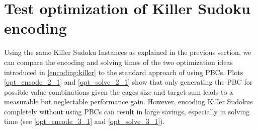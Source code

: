 \section{Test optimization of Killer Sudoku encoding}
Using the same Killer Sudoku Instances as explained in the previous section, we can compare the encoding and solving times of the two optimization ideas introduced in \ref{encoding:killer} to the standard approach of using PBCs. Plots \ref{opt_encode_2_1} and \ref{opt_solve_2_1} show that only generating the PBC for possible value combinations given the cages size and target sum leads to a measurable but neglectable performance gain. However, encoding Killer Sudokus completely without using PBCs can result in large savings, especially in solving time (see \ref{opt_encode_3_1} and \ref{opt_solve_3_1}).


\clearpage
